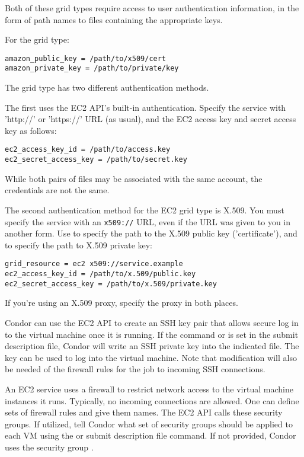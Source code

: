 Both of these grid types require access to user authentication information,
in the form of path names to files containing the appropriate keys.

For the  grid type:
\begin{verbatim}
amazon_public_key = /path/to/x509/cert
amazon_private_key = /path/to/private/key
\end{verbatim}

The  grid type has two different authentication methods.

The first uses the EC2 API's built-in authentication.  Specify the 
service with 'http://' or 'https://' URL (as usual), and the EC2 access
key and secret access key as follows:

\begin{verbatim}
ec2_access_key_id = /path/to/access.key
ec2_secret_access_key = /path/to/secret.key
\end{verbatim}

While both pairs of files may be associated with the same account, 
the credentials are not the same.

The second authentication method for the EC2 grid type is X.509.  You 
must specify the service with an \verb|x509://| URL, even if the URL was 
given to you in another form.  Use  to 
specify the path to the X.509 public key ('certificate'), and 
 to specify the path to X.509 
private key:

\begin{verbatim}
grid_resource = ec2 x509://service.example
ec2_access_key_id = /path/to/x.509/public.key
ec2_secret_access_key = /path/to/x.509/private.key
\end{verbatim}

If you're using an X.509 proxy, specify the proxy in both places.

Condor can use the EC2 API to create an SSH key pair that allows
secure log in to the virtual machine once it is running.
If the command
or 
is set in the submit description file,
Condor will write an SSH private key into the indicated file.
The key can be used to log into the virtual machine.
Note that modification will also be needed of the firewall
rules for the job to incoming SSH connections.

An EC2 service uses a firewall to restrict network access to 
the virtual machine instances it runs.
Typically, no incoming connections are allowed.
One can define sets of firewall rules and give them names.
The EC2 API calls these security groups. 
If utilized, tell Condor what set of security
groups should be applied to each VM using the
or  submit description file command.
If not provided, Condor uses the security group .

